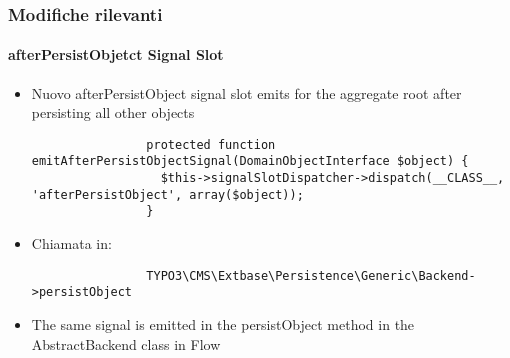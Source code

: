 \begin{frame}[fragile]
	\frametitle{Modifiche rilevanti}
	\framesubtitle{afterPersistObjetct Signal Slot}

	\lstset{
		basicstyle=\tiny\ttfamily
	}

	\begin{itemize}

		\item Nuovo afterPersistObject signal slot emits for the aggregate root after persisting all other objects

			\begin{lstlisting}
				protected function emitAfterPersistObjectSignal(DomainObjectInterface $object) {
				  $this->signalSlotDispatcher->dispatch(__CLASS__, 'afterPersistObject', array($object));
				}
			\end{lstlisting}

		\item Chiamata in:

			\begin{lstlisting}
				TYPO3\CMS\Extbase\Persistence\Generic\Backend->persistObject
			\end{lstlisting}

		\item The same signal is emitted in the persistObject method in the AbstractBackend class in Flow

	\end{itemize}

\end{frame}                                                 


